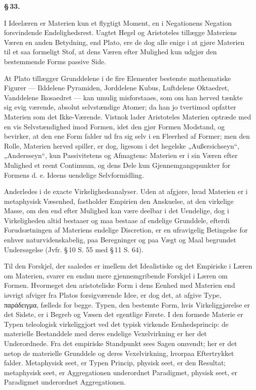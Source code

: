 \documentclass[12pt]{book}
\newcommand{\opage}[1]{\marginnote{\footnotesize\textit{[#1]}}}
\begin{document}
\begin{center}{\bfseries \S\,33.}\end{center}

I Ideelæren er Materien kun et flygtigt Moment, en i Negationens Negation forsvindende
Endelighedsrest. Uagtet Hegel og Aristoteles tillægge Materiens Væren en anden Betydning, end
Plato, ere de dog alle enige i at gjøre Materien til et saa formeligt Stof, at dens Væren efter
Mulighed kun udgjør den bestemmende Forms passive Side.

At Plato tillægger Grunddelene i de fire Elementer bestemte mathematiske Figurer --- Ilddelene
Pyramiden, Jorddelene Kubus, Luftdelene Oktaedret, Vanddelene Ikosaedret --- kan umulig
misforstaaes, som om han herved
\opage{174} tænkte sig evig værende, absolut selvstændige Atomer; da han jo tvertimod opfatter Materien som det
Ikke-Værende. Vistnok lader Aristoteles Materien optræde med en vis Selvstændighed imod Formen,
idet den gjør Formen Modstand, og bevirker, at den ene Form falder ud fra sig selv i en Fleerhed af
Former; men den Rolle, Materien herved spiller, er dog, ligesom i det hegelske „Außersichseyn“,
„Andersseyn“, kun Passivitetens og Afmagtens: Materien er i sin Væren efter Mulighed et reent
Continuum, og dens Dele kun Gjennemgangspunkter for Formens d. e. Ideens uendelige Selvformidling.

Anderledes i de exacte Virkelighedsanalyser. Uden at afgjøre, hvad Materien er i metaphysisk
Væsenhed, fastholder Empirien den Anskuelse, at den virkelige Masse, om den end efter Mulighed kan
være deelbar i det Uendelige, dog i Virkeligheden altid bestaaer og maa bestaae af endelige
Grunddele, efterdi Forudsætningen af Materiens endelige Discretion, er en ufravigelig Betingelse
for enhver naturvidenskabelig, paa Beregninger og paa Vægt og Maal begrundet Undersøgelse
(Jvfr. \S\,10 S. 55 med \S\,11 S. 64).

Til den Forskjel, der saaledes er imellem det Idealistiske og det Empiriske i Læren om Materien,
svarer en endnu mere gjennemgribende Forskjel i Læren om Formen. Hvormeget den aristoteliske Form
i dens Eenhed med Materien end iøvrigt afviger fra Platos forsigværende Idee, er dog det, at afgive
Type, παράδειγμα, fælleds for begge. Typen, den bestemte Form, hvis Virkeliggjørelse er det Sidste,
er i Begreb og Væsen det egentlige Første. I den formede Materie er Typen teleologisk virkeliggjort
ved det typisk virkende Eenhedsprincip: de materielle Bestanddele med deres endelige Vexelvirkning
er her det Underordnede. Fra det empiriske Standpunkt sees Sagen omvendt; her er det netop de
materielle Grunddele og deres Vexelvirkning, hvorpaa Eftertrykket falder. Metaphysisk seet, er Typen
Princip, physisk seet, er den Resultat; metaphysisk
\opage{175} seet, er Aggregationen underordnet Paradigmet, physisk seet, er Paradigmet underordnet
Aggregationen.
\end{document}
